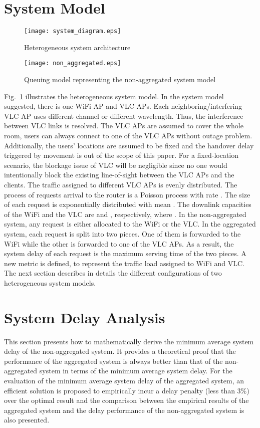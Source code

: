 \documentclass[10pt,journal]{IEEEtran}
\begin{document}
\section{System Model}\label{sec2}
\begin{figure}
\centering
\texttt{[image: system\_diagram.eps]}
\caption{Heterogeneous system architecture}
\label{fig_system_diagram}
\end{figure}

\begin{figure}
\centering
 \texttt{[image: non\_aggregated.eps]}
\caption{Queuing model representing the non-aggregated system model}
\label{fig_non_aggregated}
\end{figure}
Fig.~\ref{fig_system_diagram} illustrates the heterogeneous system model. In the system model suggested, there is one WiFi AP and  VLC APs. Each neighboring/interfering VLC AP uses different channel or different wavelength. Thus, the interference between VLC links is resolved. The VLC APs are assumed to cover the whole room, users can always connect to one of the VLC APs without outage problem. Additionally, the users' locations are assumed to be fixed and the handover delay triggered by movement is out of the scope of this paper. For a fixed-location scenario, the blockage issue of VLC will be negligible since no one would intentionally block the existing line-of-sight between the VLC APs and the clients. The traffic assigned to different VLC APs is evenly distributed. The process of requests arrival to the router is a Poisson process with rate . The size of each request is exponentially distributed with mean . The downlink capacities of the WiFi and the VLC are  and , respectively, where . In the non-aggregated system, any request is either allocated to the WiFi or the VLC. In the aggregated system, each request is split into two pieces. One of them is forwarded to the WiFi while the other is forwarded to one of the VLC APs. As a result, the system delay of each request is the maximum serving time of the two pieces. A new metric  is defined, to represent the traffic load assigned to WiFi and VLC. The next section describes in details the different configurations of two heterogeneous system models.



\section{System Delay Analysis}\label{sec3}
This section presents how to mathematically derive the minimum average system delay of the non-aggregated system. It provides a theoretical proof that the performance of the aggregated system is always better than that of the non-aggregated system in terms of the minimum average system delay. For the evaluation of the minimum average system delay of the aggregated system, an efficient solution is proposed to empirically incur a delay penalty (less than 3\%) over the optimal result and the comparison between the empirical results of the aggregated system and the delay performance of the non-aggregated system is also presented.
\end{document}
